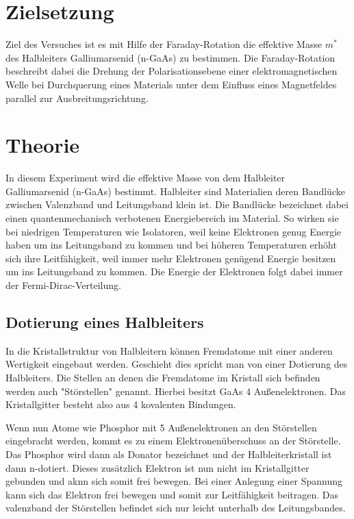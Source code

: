 \section{Zielsetzung}
\label{sec:Ziel}

Ziel des Versuches ist es mit Hilfe der Faraday-Rotation die effektive Masse $m^*$ des Halbleiters Galliumarsenid (n-GaAs) zu bestimmen. Die Faraday-Rotation beschreibt dabei die Drehung der Polarisationsebene einer elektromagnetischen Welle bei Durchquerung eines Materials unter dem Einfluss eines Magnetfeldes parallel zur Ausbreitungsrichtung.

\section{Theorie}
\label{sec:Theorie}

In diesem Experiment wird die effektive Masse von dem Halbleiter Galliumarsenid (n-GaAs) bestimmt. Halbleiter sind Materialien deren Bandlücke zwischen Valenzband und Leitungsband klein ist. Die Bandlücke bezeichnet dabei einen quantenmechanisch verbotenen Energiebereich im Material. So wirken sie bei niedrigen Temperaturen wie Isolatoren, weil keine Elektronen genug Energie haben um ins Leitungsband zu kommen und bei höheren Temperaturen erhöht sich ihre Leitfähigkeit, weil immer mehr Elektronen genügend Energie besitzen um ins Leitungsband zu kommen. Die Energie der Elektronen folgt dabei immer der Fermi-Dirac-Verteilung.

\subsection{Dotierung eines Halbleiters}
\label{sec:Dotierung}

In die Kristallstruktur von Halbleitern können Fremdatome mit einer anderen Wertigkeit eingebaut werden. Geschieht dies spricht man von einer Dotierung des Halbleiters. Die Stellen an denen die Fremdatome im Kristall sich befinden werden auch "Störstellen" genannt. Hierbei besitzt GaAs 4 Außenelektronen. Das Kristallgitter besteht also aus 4 kovalenten Bindungen.

Wenn nun Atome wie Phosphor mit 5 Außenelektronen an den Störstellen eingebracht werden, kommt es zu einem Elektronenüberschuss an der Störstelle. Das Phosphor wird dann als Donator bezeichnet und der Halbleiterkristall ist dann n-dotiert. Dieses zusätzlich Elektron ist nun nicht im Kristallgitter gebunden und aknn sich somit frei bewegen. Bei einer Anlegung einer Spannung kann sich das Elektron frei bewegen und somit zur Leitfähigkeit beitragen. Das valenzband der Störstellen befindet sich nur leicht unterhalb des Leitungsbandes.

